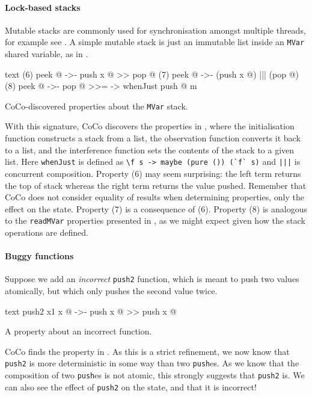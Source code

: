 \paragraph{Lock-based stacks}
Mutable stacks are commonly used for synchronisation amongst multiple
threads, for example see \cite{dodds2015}.  A simple mutable stack is
just an immutable list inside an \verb|MVar| shared variable, as in
.

\begin{listing}
\centering
\begin{cminted}{text}
(6)  peek @  ->-  push x @ >> pop @
(7)  peek @  ->-  (push x @) ||| (pop @)
(8)  peek @  ->-  pop @ >>= \m -> whenJust push @ m
\end{cminted}
\caption{CoCo-discovered properties about the \texttt{MVar} stack.}\label{lst:lockstack2}
\end{listing}

With this signature, CoCo discovers the properties in
, where the initialisation function constructs a
stack from a list, the observation function converts it back to a
list, and the interference function sets the contents of the stack to
a given list.  Here \verb|whenJust| is defined as
\verb|\f s -> maybe (pure ()) (`f` s)| and \verb#|||# is concurrent
composition.  Property (6) may seem surprising: the left term returns
the top of stack whereas the right term returns the value pushed.
Remember that CoCo does not consider equality of results when
determining properties, only the effect on the state.  Property (7) is
a consequence of (6).  Property (8) is analogous to the
\verb|readMVar| properties presented in , as we
might expect given how the stack operations are defined.

\paragraph{Buggy functions}
Suppose we add an \emph{incorrect} \verb|push2| function, which is
meant to push two values atomically, but which only pushes the second
value twice.

\begin{listing}
\centering
\begin{cminted}{text}
push2 x1 x @  ->-  push x @ >> push x @
\end{cminted}
\caption{A property about an incorrect function.}\label{lst:lockstack3}
\end{listing}

CoCo finds the property in .  As this is a strict
refinement, we now know that \verb|push2| is more deterministic in
some way than two \verb|push|es.  As we know that the composition of
two \verb|push|es is not atomic, this strongly suggests that
\verb|push2| is.  We can also see the effect of \verb|push2| on the
state, and that it is incorrect!

